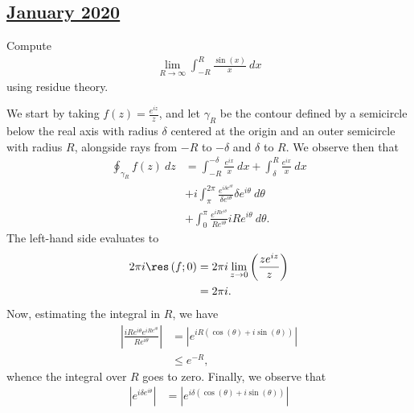 \documentclass[10pt]{mypackage}
\begin{document}
\subsection{\href{https://math.virginia.edu/graduate/exams/analysis/2020Jan_complex.html}{January 2020}}%
\begin{problem}[Problem 1]
  Compute
  \begin{align*}
    \lim_{R\rightarrow\infty} \int_{-R}^{R} \frac{\sin\left( x \right)}{x}\:dx
  \end{align*}
  using residue theory.
\end{problem}
\begin{solution}
  We start by taking $f(z) = \frac{e^{iz}}{z}$, and let $\gamma_R$ be the contour defined by a semicircle below the real axis with radius $\delta $ centered at the origin and an outer semicircle with radius $R$, alongside rays from $-R$ to $-\delta$ and $\delta$ to $R$. We observe then that
  \begin{align*}
    \oint_{\gamma_R}^{} f(z)\:dz &= \int_{-R}^{-\delta} \frac{e^{ix}}{x}\:dx + \int_{\delta}^{R} \frac{e^{ix}}{x}\:dx\\
                                 &+ i\int_{\pi}^{2\pi} \frac{e^{i\delta e^{i\theta}}}{\delta e^{i\theta}}\delta e^{i\theta}\:d\theta\\
                                 &+ \int_{0}^{\pi} \frac{e^{iRe^{i\theta}}}{Re^{i\theta}}iRe^{i\theta}\:d\theta.
  \end{align*}
  The left-hand side evaluates to
  \begin{align*}
    2\pi i \res\left( f;0 \right) &= 2\pi i \lim_{z\rightarrow 0} \left( \frac{ze^{iz}}{z} \right)\\
                                  &= 2\pi i.
  \end{align*}
  Now, estimating the integral in $R$, we have
  \begin{align*}
    \left\vert \frac{iRe^{i\theta}e^{iRe^{i\theta}}}{Re^{i\theta}} \right\vert &= \left\vert e^{iR\left( \cos\left( \theta \right) + i\sin\left( \theta \right) \right)} \right\vert\\
                                                                               &\leq e^{-R},
  \end{align*}
  whence the integral over $R$ goes to zero. Finally, we observe that
  \begin{align*}
    \left\vert e^{i\delta e^{i\theta}}\right\vert &= \left\vert e^{i\delta\left( \cos\left( \theta \right) + i\sin\left( \theta \right) \right)} \right\vert\\

\end{align*}
\end{solution}
\end{document}
